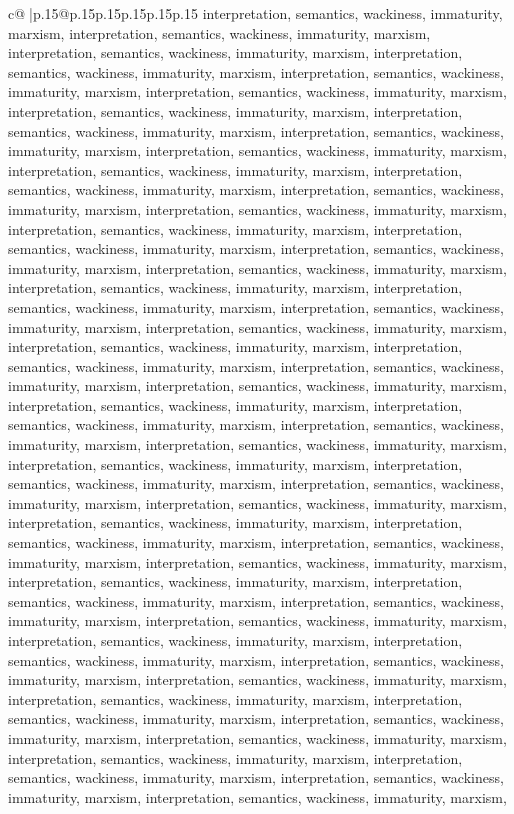 \documentclass{article}
\begin{document}
{\begin{supertabular}{c@{$\;$}|p{.15\linewidth}@{}p{.15\linewidth}p{.15\linewidth}p{.15\linewidth}p{.15\linewidth}p{.15\linewidth}}
{{{interpretation, semantics, wackiness, immaturity, marxism, interpretation, semantics, wackiness, immaturity, marxism, interpretation, semantics, wackiness, immaturity, marxism, interpretation, semantics, wackiness, immaturity, marxism, interpretation, semantics, wackiness, immaturity, marxism, interpretation, semantics, wackiness, immaturity, marxism, interpretation, semantics, wackiness, immaturity, marxism, interpretation, semantics, wackiness, immaturity, marxism, interpretation, semantics, wackiness, immaturity, marxism, interpretation, semantics, wackiness, immaturity, marxism, interpretation, semantics, wackiness, immaturity, marxism, interpretation, semantics, wackiness, immaturity, marxism, interpretation, semantics, wackiness, immaturity, marxism, interpretation, semantics, wackiness, immaturity, marxism, interpretation, semantics, wackiness, immaturity, marxism, interpretation, semantics, wackiness, immaturity, marxism, interpretation, semantics, wackiness, immaturity, marxism, interpretation, semantics, wackiness, immaturity, marxism, interpretation, semantics, wackiness, immaturity, marxism, interpretation, semantics, wackiness, immaturity, marxism, interpretation, semantics, wackiness, immaturity, marxism, interpretation, semantics, wackiness, immaturity, marxism, interpretation, semantics, wackiness, immaturity, marxism, interpretation, semantics, wackiness, immaturity, marxism, interpretation, semantics, wackiness, immaturity, marxism, interpretation, semantics, wackiness, immaturity, marxism, interpretation, semantics, wackiness, immaturity, marxism, interpretation, semantics, wackiness, immaturity, marxism, interpretation, semantics, wackiness, immaturity, marxism, interpretation, semantics, wackiness, immaturity, marxism, interpretation, semantics, wackiness, immaturity, marxism, interpretation, semantics, wackiness, immaturity, marxism, interpretation, semantics, wackiness, immaturity, marxism, interpretation, semantics, wackiness, immaturity, marxism, interpretation, semantics, wackiness, immaturity, marxism, interpretation, semantics, wackiness, immaturity, marxism, interpretation, semantics, wackiness, immaturity, marxism, interpretation, semantics, wackiness, immaturity, marxism, interpretation, semantics, wackiness, immaturity, marxism, interpretation, semantics, wackiness, immaturity, marxism, interpretation, semantics, wackiness, immaturity, marxism, interpretation, semantics, wackiness, immaturity, marxism, interpretation, semantics, wackiness, immaturity, marxism, interpretation, semantics, wackiness, immaturity, marxism, interpretation, semantics, wackiness, immaturity, marxism, interpretation, semantics, wackiness, immaturity, marxism, interpretation, semantics, wackiness, immaturity, marxism, interpretation, semantics, wackiness, immaturity, marxism, interpretation, semantics, wackiness, immaturity, marxism, interpretation, semantics, wackiness, immaturity, marxism, interpretation, semantics, wackiness, immaturity, marxism, interpretation, semantics, wackiness, immaturity, marxism, interpretation, semantics, wackiness, immaturity, marxism, interpretation, semantics, wackiness, immaturity, marxism, }}}
\end{supertabular}}
\end{document}
